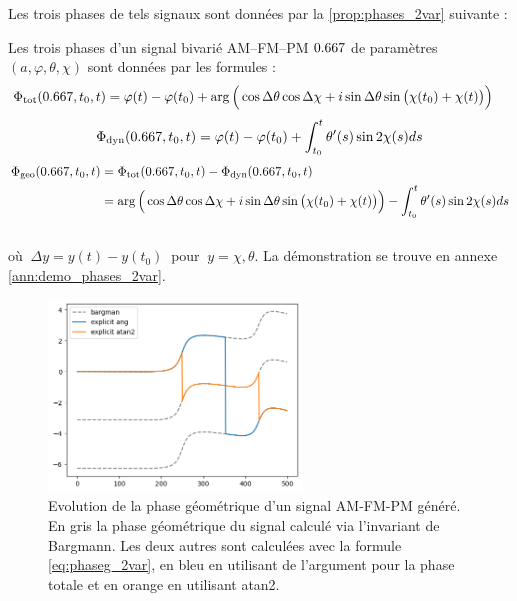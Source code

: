 Les trois phases de tels signaux sont données par la \cref{prop:phases_2var} suivante :
\begin{proposition}\label{prop:phases_2var}
	Les trois phases d'un signal bivarié AM--FM--PM $\x$ 	de paramètres $(a,\varphi,\theta,\chi)$ sont données par les formules :
	\begin{equation}\label{eq:phaset_2var}
		\begin{aligned}
			\phaset(\x,t_0,t) &= \varphi(t)-\varphi(t_0) + \arg\Big(\cos\Delta\theta \cos\Delta\chi + i\sin\Delta\theta \sin\big(\chi(t_0)+\chi(t)\big)\Big)
		\end{aligned}
	\end{equation}
	\begin{equation}\label{eq:phased_2var}
		\phased(\x, t_0,t) = \varphi(t) -\varphi(t_0) + \int_{t_0}^t\theta'(s) \sin2\chi(s) ds
	\end{equation}
	\begin{equation}\label{eq:phaseg_2var}
	\begin{aligned}
		\phaseg(\x,t_0,t) &= \phaset(\x,t_0,t) - \phased(\x,t_0,t) \\
			&= \arg\Big(\cos\Delta\theta \cos\Delta\chi + i\sin\Delta\theta \sin\big(\chi(t_0)+\chi(t)\big)\Big) - \int_{t_0}^t\theta'(s) \sin2\chi(s) ds
	\end{aligned}
	\end{equation}
	\\
	où $\ \Delta y = y(t) - y(t_0)\ $ pour $\ y = \chi, \theta$. La démonstration se trouve en annexe \ref{ann:demo_phases_2var}.
\end{proposition}

\begin{figure}[h]
	\includegraphics[width = 0.6\textwidth]{fig/premier_resultat}
	\caption[Evolution de la phase géométrique d'un signal AM-FM-PM]{Evolution de la phase géométrique d'un signal AM-FM-PM généré. En gris la phase géométrique du signal calculé via l'invariant de Bargmann. Les deux autres sont calculées avec la formule \cref{eq:phaseg_2var}, en bleu en utilisant de l'argument pour la phase totale et en orange en utilisant atan2.}
\end{figure}

